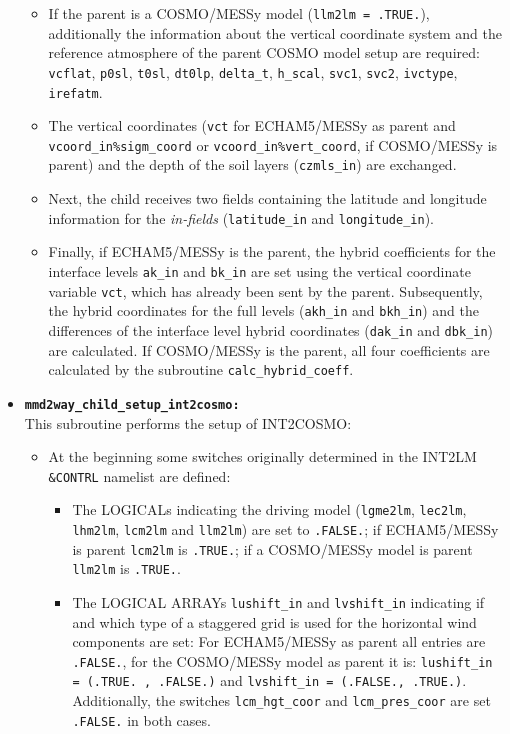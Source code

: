 \documentclass[11pt,twoside]{article}
\begin{document}
\begin{itemize}
\begin{itemize}
\item  If the parent is a COSMO/MESSy model (\verb|llm2lm = .TRUE.|),  
additionally the
information about the vertical coordinate system and the reference atmosphere
of the parent COSMO model setup  are required: \verb|vcflat|, \verb|p0sl|,
 \verb|t0sl|, \verb|dt0lp|, \verb|delta_t|, \verb|h_scal|, \verb|svc1|,
 \verb|svc2|, \verb|ivctype|, \verb|irefatm|.
\item The vertical coordinates (\verb|vct| for ECHAM5/MESSy as parent and 
\verb|vcoord_in%sigm_coord| or \verb|vcoord_in%vert_coord|, if
 COSMO/MESSy is parent) 
 and the depth of the soil layers (\verb|czmls_in|) are exchanged. 
\item Next, 
the child receives two fields containing the latitude and longitude 
information for the {\it in-fields} (\verb|latitude_in|
and \verb|longitude_in|). 
\item Finally, if ECHAM5/MESSy is the parent,
 the hybrid coefficients for the interface levels
\verb|ak_in| and \verb|bk_in| are set using the vertical coordinate variable 
\verb|vct|, which has already been sent by the parent.
 Subsequently, the hybrid coordinates for the full levels 
(\verb|akh_in| and \verb|bkh_in|) and the differences of the interface level
 hybrid coordinates (\verb|dak_in| and \verb|dbk_in|) are calculated.
If COSMO/MESSy is the parent, all four  coefficients are
calculated by the subroutine \verb|calc_hybrid_coeff|.
\end{itemize}%

 
\item{\tt \bf mmd2way\_child\_setup\_int2cosmo:\\}
This subroutine performs the setup of INT2COSMO:
\begin{itemize}%
\item At the beginning some switches originally determined in the INT2LM 
\verb|&CONTRL| namelist are defined:
\begin{itemize} %
\item The {\footnotesize LOGICALs} indicating the driving model (\verb|lgme2lm|, 
\verb|lec2lm|, \verb|lhm2lm|, \verb|lcm2lm| and \verb|llm2lm|) are set to  
\verb|.FALSE.|; if ECHAM5/MESSy is parent  \verb|lcm2lm| is \verb|.TRUE.|; if a 
COSMO/MESSy model is parent \verb|llm2lm| is \verb|.TRUE.|.
\item The {\footnotesize LOGICAL ARRAYs} \verb|lushift_in| and \verb|lvshift_in|
indicating if and which type of a staggered grid is used for the horizontal 
wind components are set: For ECHAM5/MESSy as parent all entries are 
\verb|.FALSE.|, 
for the COSMO/MESSy model as parent it is: 
\verb|lushift_in = (.TRUE. , .FALSE.)| and \verb|lvshift_in = (.FALSE., .TRUE.)|.
Additionally, the switches \verb|lcm_hgt_coor|
and \verb|lcm_pres_coor| are set \verb|.FALSE.| in both cases.
\end{itemize}%


\end{itemize}
\end{itemize}
\end{document}
